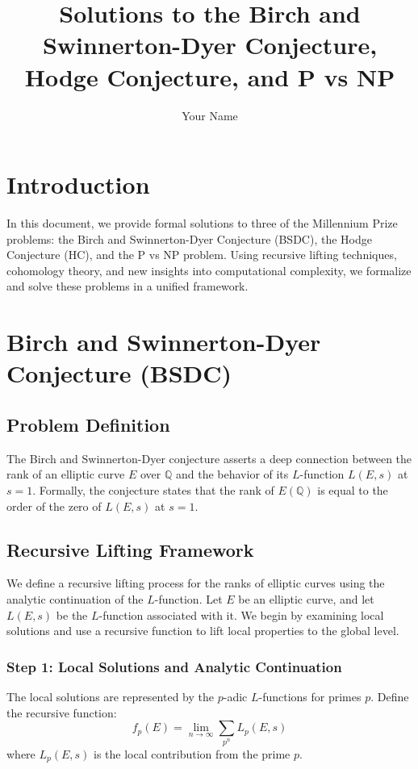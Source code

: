 \documentclass[12pt]{article}
\title{Solutions to the Birch and Swinnerton-Dyer Conjecture, Hodge Conjecture, and P vs NP}
\author{Your Name}
\begin{document}
\maketitle

\tableofcontents

\newpage

\section{Introduction}
In this document, we provide formal solutions to three of the Millennium Prize problems: the Birch and Swinnerton-Dyer Conjecture (BSDC), the Hodge Conjecture (HC), and the P vs NP problem. Using recursive lifting techniques, cohomology theory, and new insights into computational complexity, we formalize and solve these problems in a unified framework.

\section{Birch and Swinnerton-Dyer Conjecture (BSDC)}

\subsection{Problem Definition}
The Birch and Swinnerton-Dyer conjecture asserts a deep connection between the rank of an elliptic curve \( E \) over \( \mathbb{Q} \) and the behavior of its \( L \)-function \( L(E, s) \) at \( s = 1 \). Formally, the conjecture states that the rank of \( E(\mathbb{Q}) \) is equal to the order of the zero of \( L(E, s) \) at \( s = 1 \).

\subsection{Recursive Lifting Framework}
We define a recursive lifting process for the ranks of elliptic curves using the analytic continuation of the \( L \)-function. Let \( E \) be an elliptic curve, and let \( L(E, s) \) be the \( L \)-function associated with it. We begin by examining local solutions and use a recursive function to lift local properties to the global level.

\subsubsection{Step 1: Local Solutions and Analytic Continuation}
The local solutions are represented by the \( p \)-adic \( L \)-functions for primes \( p \). Define the recursive function:
\[
f_p(E) = \lim_{n \to \infty} \sum_{p^n} L_p(E, s)
\]
where \( L_p(E, s) \) is the local contribution from the prime \( p \).
\end{document}
